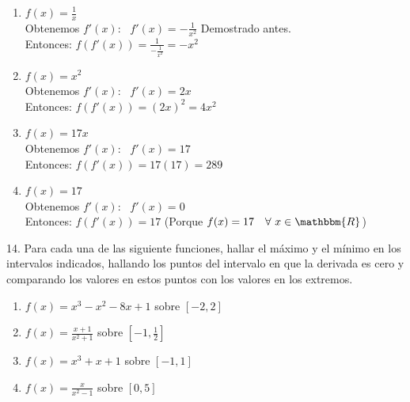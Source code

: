 \documentclass[12pt]{article}
\begin{document}
\begin{enumerate}[\hspace{9px} a)]
    \item \(f(x)=\displaystyle\frac{1}{x}\)\\

        Obtenemos $f'(x)$: \ \(f'(x)=\displaystyle-\frac{1}{x^2}\) \qquad Demostrado antes.\\

        Entonces: \quad \(f(f'(x))=\displaystyle\frac{1}{\displaystyle-\frac{1}{x^2}}=-x^2\)

    \item \(f(x)=x^2\)\\

        Obtenemos $f'(x)$: \ \(f'(x)=2x\)\\

        Entonces: \quad \(f(f'(x))=(2x)^2=4x^2\)

    \item \(f(x)=17x\)\\

        Obtenemos $f'(x)$: \ \(f'(x)=17\)\\

        Entonces: \quad \(f(f'(x))=17(17)=289\)

    \item \(f(x)=17\)\\

        Obtenemos $f'(x)$: \ \(f'(x)=0\)\\

        Entonces: \quad \(f(f'(x))=17\) \qquad (Porque \(f(x)=17 \quad \forall \ x \in \mathbbm{R}\))\\

\end{enumerate}

14. Para cada una de las siguiente funciones, hallar el m\'aximo y el m\'inimo en los intervalos indicados, hallando los puntos del intervalo en que la derivada es cero y comparando los valores en estos puntos con los valores en los extremos.

\begin{enumerate}[\hspace{9px} a)]
    \item \(f(x)=x^3-x^2-8x+1\) sobre $[-2,2]$
    \item \(f(x)=\displaystyle\frac{x+1}{x^2+1}\) sobre $\left[-1,\frac{1}{2}\right]$
    \item \(f(x)=x^3+x+1\) sobre $[-1,1]$
    \item \(f(x)=\displaystyle\frac{x}{x^2-1}\) sobre $[0,5]$
\end{enumerate}
\end{document}
